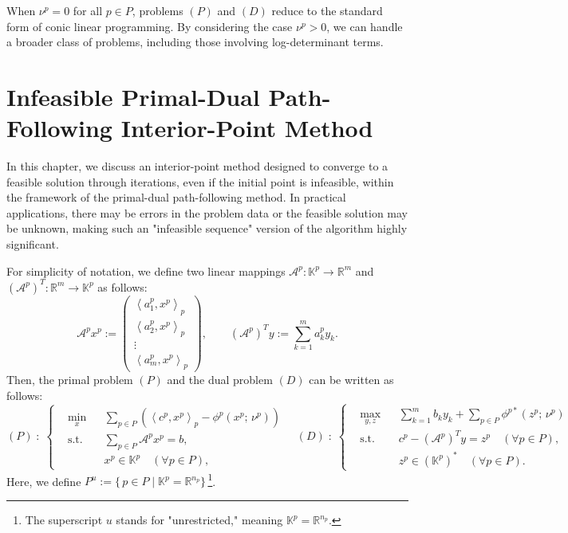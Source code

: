 \documentclass{scrartcl}
\begin{document}
When $\nu^p = 0$ for all $p \in P$, problems $(P)$ and $(D)$ reduce to the standard form of conic linear programming. By considering the case $\nu^p > 0$, we can handle a broader class of problems, including those involving log-determinant terms.



\section{Infeasible Primal-Dual Path-Following Interior-Point Method}
\label{sec:infeasible_IPM}

In this chapter, we discuss an interior-point method designed to converge to a feasible solution through iterations, even if the initial point is infeasible, within the framework of the primal-dual path-following method. In practical applications, there may be errors in the problem data or the feasible solution may be unknown, making such an "infeasible sequence" version of the algorithm highly significant.

\medskip

\noindent
For simplicity of notation, we define two linear mappings 
$\mathcal{A}^p : \mathbb{K}^p \to \mathbb{R}^m$ and 
$(\mathcal{A}^p)^T : \mathbb{R}^m \to \mathbb{K}^p$ 
as follows:
\[
  \mathcal{A}^p x^p
  := 
  \begin{pmatrix}
      \left\langle a^p_1, x^p \right\rangle_p \\
      \left\langle a^p_2, x^p \right\rangle_p \\
      \vdots \\
      \left\langle a^p_m, x^p \right\rangle_p
  \end{pmatrix},
  \qquad
  (\mathcal{A}^p)^T y
  :=
  \sum_{k=1}^m a^p_k y_k.
\]
Then, the primal problem $(P)$ and the dual problem $(D)$ can be written as follows:
\[
  (P)\;:\;
  \left\{
  \begin{aligned}
      &\min_{x}
       && \sum_{p \in P} \left( \left\langle c^p, x^p \right\rangle_p - \phi^p(x^p;\, \nu^p) \right) \\
      &\text{s.t.}
       && \sum_{p \in P} \mathcal{A}^p x^p = b,\\
      & && x^p \in \mathbb{K}^p \quad (\forall p \in P),
  \end{aligned}
  \right.
  \quad
  (D)\;:\;
  \left\{
  \begin{aligned}
      &\max_{y,z}
       && \sum_{k=1}^m b_k y_k 
          + \sum_{p \in P} \phi^{p*}(z^p;\, \nu^p) \\
      &\text{s.t.}
       && c^p - (\mathcal{A}^p)^T y = z^p \quad (\forall p \in P),\\
      & && z^p \in (\mathbb{K}^p)^* \quad (\forall p \in P).
  \end{aligned}
  \right.
\]
Here, we define $P^u := \{\, p \in P \mid \mathbb{K}^p = \mathbb{R}^{n_p} \}\,$\footnote{%
  The superscript $u$ stands for "unrestricted," meaning $\mathbb{K}^p = \mathbb{R}^{n_p}$.
}.
\end{document}
